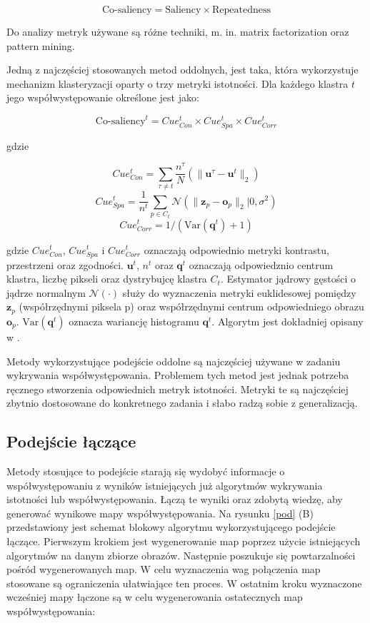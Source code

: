 \documentclass[a4paper,11pt, notitlepage, twosides, openany ]{report}
\begin{document}
	$$
		\text{Co-saliency} = \text{Saliency} \times \text{Repeatedness}
	$$



	Do analizy metryk używane są różne techniki, m. in. matrix factorization oraz pattern mining. 

	Jedną z najczęściej stosowanych metod oddolnych, jest taka, która wykorzystuje mechanizm klasteryzacji oparty o trzy metryki istotności. Dla każdego klastra $t$ jego współwystępowanie określone jest jako:

	$$
		\text{Co-saliency}^t = Cue^t_{Con} \times Cue^t_{Spa} \times Cue^t_{Corr}
	$$

	gdzie

	$$
		Cue^t_{Con} = \sum_{\tau \neq t} \frac{n^\tau}{N}\left(\|\mathbf{u}^\tau - \mathbf{u}^t\|_2\right)
	$$
	$$
		Cue^t_{Spa} = \frac{1}{n^t}\sum_{p \in C_t} \mathcal{N}\left(\|\mathbf{z}_p - \mathbf{o}_p\|_2|0,\sigma^2\right)
	$$
	$$
		Cue^t_{Corr} = 1/\left(\text{Var}\left(\mathbf{q}^t\right)+1\right)
	$$

	gdzie $Cue^t_{Con}$, $Cue^t_{Spa}$ i $Cue^t_{Corr}$ oznaczają odpowiednio metryki kontrastu, przestrzeni oraz zgodności. $\mathbf{u}^t$, $n^t$ oraz $\mathbf{q}^t$ oznaczają odpowiedznio centrum klastra, liczbę pikseli oraz dystrybujcę klastra $C_t$. Estymator jądrowy gęstości o jądrze normalnym $\mathcal{N}(\cdot)$ służy do wyznaczenia metryki euklidesowej pomiędzy $\mathbf{z}_p$ (współrzędnymi piksela p) oraz współrzędnymi centrum odpowiedniego obrazu $\mathbf{o}_p$. $\text{Var}\left(\mathbf{q}^t\right)$ oznacza wariancję histogramu $\mathbf{q}^t$. Algorytm jest dokładniej opisany w \cite{bott}.

	Metody wykorzystujące podejście oddolne są najczęściej używane w zadaniu wykrywania współwystępowania. Problemem tych metod jest jednak potrzeba ręcznego stworzenia odpowiednich metryk istotności. Metryki te są najczęściej zbytnio dostosowane do konkretnego zadania i słabo radzą sobie z generalizacją.

	\subsection{Podejście łączące}
	Metody stosujące to podejście starają się wydobyć informacje o współwystępowaniu z wyników istniejących już algorytmów wykrywania istotności lub współwystępowania. Łączą te wyniki oraz zdobytą wiedzę, aby generować wynikowe mapy współwystępowania. Na rysunku \ref{pod} (B) przedstawiony jest schemat blokowy algorytmu wykorzystującego podejście łączące. Pierwszym krokiem jest wygenerowanie map poprzez użycie istniejących algorytmów na danym zbiorze obrazów. Następnie poszukuje się powtarzalności pośród wygenerowanych map. W celu wyznaczenia wag połączenia map stosowane są ograniczenia ułatwiające ten proces. W ostatnim kroku wyznaczone wcześniej mapy łączone są w celu wygenerowania ostatecznych map współwystępowania:
\end{document}
